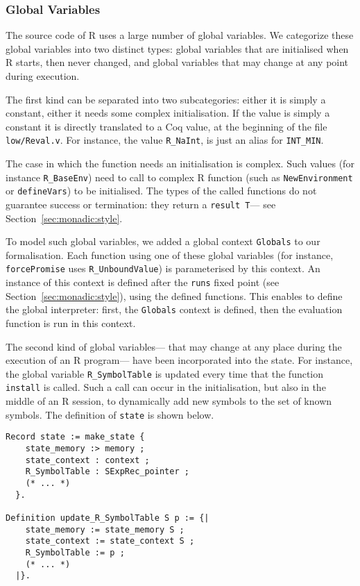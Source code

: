 \documentclass{article}
\newcommand\Coq{Coq}
\newcommand\R{R}
\begin{document}
\subsubsection{Global Variables}
\label{sec:global:variables}

The source code of \R{} uses a large number of global variables.
We categorize these global variables into two distinct types:
global variables that are initialised when \R{} starts, then never changed,
and global variables that may change at any point during execution.

The first kind can be separated into two subcategories:
either it is simply a constant, either it needs some complex initialisation.
If the value is simply a constant
it is directly translated to a \Coq{} value,
at the beginning of the file \texttt{low/Reval.v}.
For instance, the value \texttt{R_NaInt},
is just an alias for \texttt{INT_MIN}.

The case in which the function needs an initialisation is complex.
Such values (for instance \texttt{R_BaseEnv})
need to call to complex \R{} function
(such as \texttt{NewEnvironment} or \texttt{defineVars})
to be initialised.
The types of the called functions do not guarantee success or termination:
they return a \texttt{result T}—%
see Section~\ref{sec:monadic:style}.

To model such global variables,
we added a global context \texttt{Globals} to our formalisation.
Each function using one of these global variables
(for instance, \texttt{forcePromise}
uses \texttt{R_UnboundValue})
is parameterised by this context.
An instance of this context is defined after the \texttt{runs}
fixed point (see Section~\ref{sec:monadic:style}),
using the defined functions.
This enables to define the global interpreter:
first, the \texttt{Globals} context is defined,
then the evaluation function is run in this context.

The second kind of global variables—%
that may change at any place during the execution of an \R{} program—%
have been incorporated into the state.
For instance, the global variable \texttt{R_SymbolTable}
is updated every time that the function
\texttt{install} is called.
Such a call can occur in the initialisation,
but also in the middle of an \R{} session,
to dynamically add new symbols to the set of known symbols.
The definition of \texttt{state} is shown below.
\begin{verbatim}
Record state := make_state {
    state_memory :> memory ;
    state_context : context ;
    R_SymbolTable : SExpRec_pointer ;
    (* ... *)
  }.

Definition update_R_SymbolTable S p := {|
    state_memory := state_memory S ;
    state_context := state_context S ;
    R_SymbolTable := p ;
    (* ... *)
  |}.
\end{verbatim}
\end{document}
